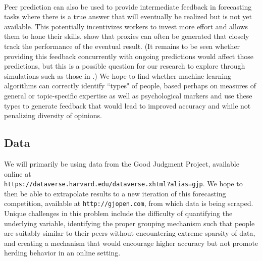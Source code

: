 \documentclass[a4paper, 11pt]{article}
\begin{document}
\paragraph{} Peer prediction can also be used to provide intermediate feedback in forecasting tasks where there is a true answer that will eventually be realized but is not yet available. This potentially incentivizes workers to invest more effort and allows them to hone their skills. \citet{witkowski2017proper} show that proxies can often be generated that closely track the performance of the eventual result. (It remains to be seen whether providing this feedback concurrently with ongoing predictions would affect those predictions, but this is a possible question for our research to explore through simulations such as those in \citet{shnayder2016measuring}.) We hope to find whether machine learning algorithms can correctly identify ``types" of people, based perhaps on measures of general or topic-specific expertise as well as psychological markers and use these types to generate feedback that would lead to improved accuracy and while not penalizing diversity of opinions. 
\subsection{Data}
We will primarily be using data from the Good Judgment Project, available online at  \\ \texttt{https://dataverse.harvard.edu/dataverse.xhtml?alias=gjp}. We hope to then be able to extrapolate results to a new iteration of this forecasting competition, available at \texttt{http://gjopen.com}, from which data is being scraped. Unique challenges in this problem include the difficulty of quantifying the underlying variable, identifying the proper grouping mechanism such that people are suitably similar to their peers without encountering extreme sparsity of data, and creating a mechanism that would encourage higher accuracy but not promote herding behavior in an online setting.
\end{document}

